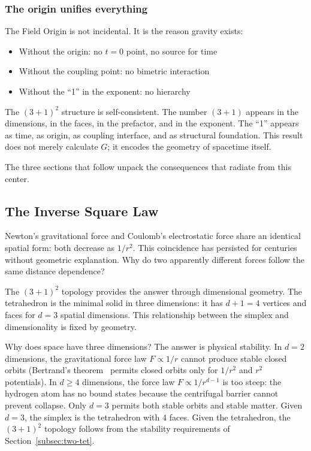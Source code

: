 \documentclass[aps,prd,preprint,superscriptaddress,showpacs,preprintnumbers,amsmath,amssymb,nofootinbib]{revtex4-2}
\begin{document}
\subsubsection*{The origin unifies everything}

The Field Origin is not incidental. It is the reason gravity exists:
\begin{itemize}
\item Without the origin: no $t = 0$ point, no source for time
\item Without the coupling point: no bimetric interaction
\item Without the ``1'' in the exponent: no hierarchy
\end{itemize}

The $(3+1)^2$ structure is self-consistent. The number $(3+1)$ appears in the dimensions, in the faces, in the prefactor, and in the exponent. The ``1'' appears as time, as origin, as coupling interface, and as structural foundation. This result does not merely calculate $G$; it encodes the geometry of spacetime itself.

The three sections that follow unpack the consequences that radiate from this center.

\subsection{The Inverse Square Law}
\label{subsec:inverse-square}

Newton's gravitational force and Coulomb's electrostatic force share an identical spatial form: both decrease as $1/r^2$. This coincidence has persisted for centuries without geometric explanation. Why do two apparently different forces follow the same distance dependence?

The $(3+1)^2$ topology provides the answer through dimensional geometry. The tetrahedron is the minimal solid in three dimensions: it has $d + 1 = 4$ vertices and faces for $d = 3$ spatial dimensions. This relationship between the simplex and dimensionality is fixed by geometry.

Why does space have three dimensions? The answer is physical stability. In $d = 2$ dimensions, the gravitational force law $F \propto 1/r$ cannot produce stable closed orbits (Bertrand's theorem~\cite{goldstein2002} permits closed orbits only for $1/r^2$ and $r^2$ potentials). In $d \geq 4$ dimensions, the force law $F \propto 1/r^{d-1}$ is too steep: the hydrogen atom has no bound states because the centrifugal barrier cannot prevent collapse. Only $d = 3$ permits both stable orbits and stable matter. Given $d = 3$, the simplex is the tetrahedron with 4 faces. Given the tetrahedron, the $(3+1)^2$ topology follows from the stability requirements of Section~\ref{subsec:two-tet}.
\end{document}
